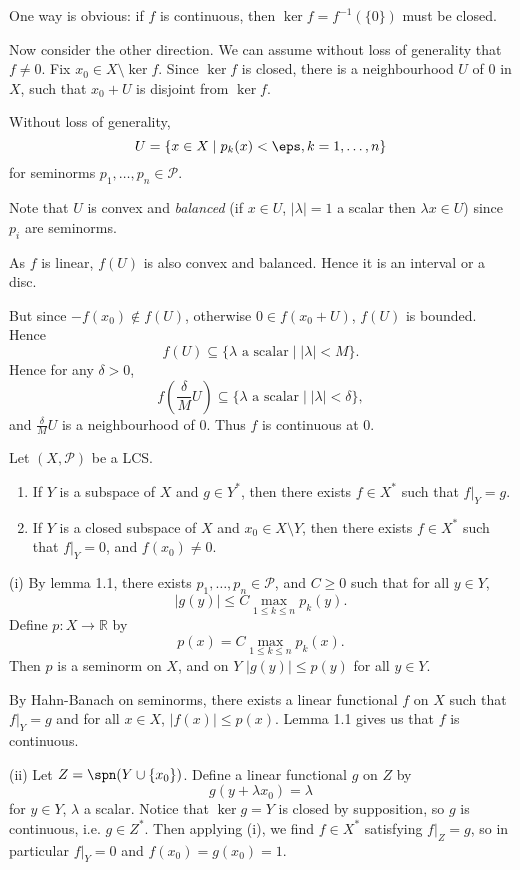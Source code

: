 \documentclass[12pt]{article}
\begin{document}
\begin{proofbox}
	One way is obvious: if $f$ is continuous, then $\ker f = f^{-1}(\{0\})$ must be closed.

	Now consider the other direction. We can assume without loss of generality that $f \neq 0$. Fix $x_0 \in X \setminus \ker f$. Since $\ker f$ is closed, there is a neighbourhood $U$ of $0$ in $X$, such that $x_0 + U$ is disjoint from $\ker f$.

	Without loss of generality,
	\[
		U = \{x \in X \mid p_k(x) < \eps, k = 1, \ldots, n\}
	\]
	for seminorms $p_1, \ldots, p_n \in \mathcal{P}$.

	Note that $U$ is convex and \emph{balanced} (if $x \in U$, $|\lambda| = 1$ a scalar then $\lambda x \in U$) since $p_i$ are seminorms.

	As $f$ is linear, $f(U)$ is also convex and balanced. Hence it is an interval or a disc.

	But since $-f(x_0) \not \in f(U)$, otherwise $0 \in f(x_0 + U)$, $f(U)$ is bounded. Hence
	\[
		f(U) \subseteq \{\lambda \text{ a scalar} \mid |\lambda| < M\}.
	\]
	Hence for any $\delta > 0$,
	\[
		f \left( \frac{\delta}{M} U\right) \subseteq \{\lambda \text{ a scalar} \mid |\lambda| < \delta\},
	\]
	and $\frac{\delta}{M} U$ is a neighbourhood of $0$. Thus $f$ is continuous at $0$.
\end{proofbox}


\begin{theorem}
	Let $(X, \mathcal{P})$ be a LCS.
	\begin{enumerate}[\normalfont(i)]
		\item If $Y$ is a subspace of $X$ and $g \in Y^\ast$, then there exists $f \in X^\ast$ such that $f|_Y = g$.
		\item If $Y$ is a closed subspace of $X$ and $x_0 \in X \setminus Y$, then there exists $f \in X^\ast$ such that $f|_Y = 0$, and $f(x_0) \neq 0$.
	\end{enumerate}
\end{theorem}

\begin{proofbox}
	

	(i) By lemma 1.1, there exists $p_1, \ldots, p_n \in \mathcal{P}$, and $C \geq 0$ such that for all $y \in Y$,
	\[
	|g(y)| \leq C \max_{1 \leq k \leq n} p_k(y).
	\]
	Define $p : X \to \mathbb{R}$ by
	\[
	p(x) = C \max_{1 \leq k \leq n} p_k(x).
	\]
	Then $p$ is a seminorm on $X$, and on $Y$ $|g(y)| \leq p(y)$ for all $y \in Y$.

	By Hahn-Banach on seminorms, there exists a linear functional $f$ on $X$ such that $f|_Y = g$ and for all $x \in X$, $|f(x)| \leq p(x)$. Lemma 1.1 gives us that $f$ is continuous.

	(ii) Let $Z = \spn(Y \cup \{x_0\})$. Define a linear functional $g$ on $Z$ by
	\[
	g(y + \lambda x_0) = \lambda
	\]
	for $y \in Y$, $\lambda$ a scalar. Notice that $\ker g = Y$ is closed by supposition, so $g$ is continuous, i.e. $g \in Z^\ast$. Then applying (i), we find $f \in X^\ast$ satisfying $f|_Z = g$, so in particular $f|_Y = 0$ and $f(x_0) = g(x_0) = 1$.
\end{proofbox}
\end{document}
